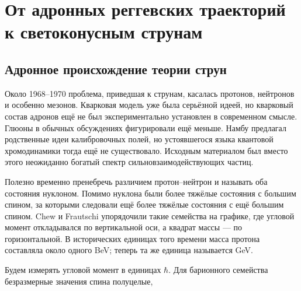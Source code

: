\chapter{От адронных реггевских траекторий к светоконусным струнам}


\section{Адронное происхождение теории струн}

Около 1968--1970 проблема, приведшая к струнам, касалась протонов,
нейтронов и особенно мезонов. Кварковая модель уже была серьёзной идеей,
но кварковый состав адронов ещё не был экспериментально установлен
в современном смысле. Глюоны в обычных обсуждениях фигурировали ещё меньше.
Намбу предлагал родственные идеи калибровочных полей, но устоявшегося языка
квантовой хромодинамики тогда ещё не существовало. Исходным материалом был
вместо этого неожиданно богатый спектр сильновзаимодействующих частиц.

Полезно временно пренебречь различием протон--нейтрон и называть
оба состояния нуклоном. Помимо нуклона были более тяжёлые состояния с большим
спином, за которыми следовали ещё более тяжёлые состояния с ещё большим
спином. Chew и Frautschi упорядочили такие семейства на графике, где угловой
момент откладывался по вертикальной оси, а квадрат массы — по горизонтальной.
В исторических единицах того времени масса протона составляла около одного BeV; теперь
та же единица называется GeV.

Будем измерять угловой момент в единицах \(\hbar\). Для барионного семейства
безразмерные значения спина полуцелые,

